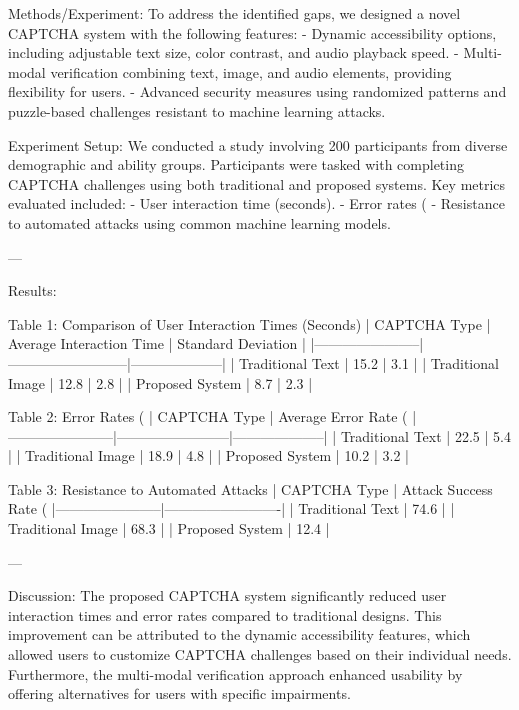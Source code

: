 Methods/Experiment:  
To address the identified gaps, we designed a novel CAPTCHA system with the following features:  
- Dynamic accessibility options, including adjustable text size, color contrast, and audio playback speed.  
- Multi-modal verification combining text, image, and audio elements, providing flexibility for users.  
- Advanced security measures using randomized patterns and puzzle-based challenges resistant to machine learning attacks.  

Experiment Setup:  
We conducted a study involving 200 participants from diverse demographic and ability groups. Participants were tasked with completing CAPTCHA challenges using both traditional and proposed systems. Key metrics evaluated included:  
- User interaction time (seconds).  
- Error rates (%
- Resistance to automated attacks using common machine learning models.  

---

Results:  

Table 1: Comparison of User Interaction Times (Seconds)  
| CAPTCHA Type          | Average Interaction Time | Standard Deviation |  
|-----------------------|--------------------------|--------------------|  
| Traditional Text      | 15.2                    | 3.1                |  
| Traditional Image     | 12.8                    | 2.8                |  
| Proposed System       | 8.7                     | 2.3                |  

Table 2: Error Rates (%
| CAPTCHA Type          | Average Error Rate (%
|-----------------------|------------------------|--------------------|  
| Traditional Text      | 22.5                  | 5.4                |  
| Traditional Image     | 18.9                  | 4.8                |  
| Proposed System       | 10.2                  | 3.2                |  

Table 3: Resistance to Automated Attacks  
| CAPTCHA Type          | Attack Success Rate (%
|-----------------------|-------------------------|  
| Traditional Text      | 74.6                    |  
| Traditional Image     | 68.3                    |  
| Proposed System       | 12.4                    |  

---

Discussion:  
The proposed CAPTCHA system significantly reduced user interaction times and error rates compared to traditional designs. This improvement can be attributed to the dynamic accessibility features, which allowed users to customize CAPTCHA challenges based on their individual needs. Furthermore, the multi-modal verification approach enhanced usability by offering alternatives for users with specific impairments.  

